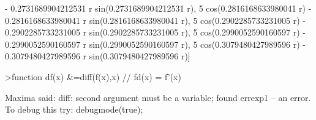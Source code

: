 \documentclass[a4paper,10pt]{article}
\begin{document}
\begin{eulernotebook}
\begin{eulercomment}
\begin{eulercomment}
\begin{eulercomment}
\begin{eulercomment}
\begin{eulercomment}
\begin{eulercomment}
\begin{eulercomment}
\begin{eulercomment}
\begin{eulercomment}
\begin{eulercomment}
\begin{eulercomment}
\begin{eulercomment}
\begin{eulercomment}
\begin{eulercomment}
\begin{eulercomment}
\begin{eulercomment}
\begin{eulercomment}
\begin{eulercomment}
\begin{eulercomment}
\begin{eulercomment}
\begin{eulercomment}
\begin{eulercomment}
\begin{eulercomment}
\begin{eulercomment}
\begin{eulercomment}
\begin{eulercomment}
\begin{eulercomment}
\begin{eulercomment}
\begin{euleroutput}
   - 0.2731689904212531 r sin(0.2731689904212531 r), 
  5 cos(0.2816168633980041 r) - 0.2816168633980041 r
   sin(0.2816168633980041 r), 5 cos(0.2902285733231005 r)
   - 0.2902285733231005 r sin(0.2902285733231005 r), 
  5 cos(0.2990052590160597 r) - 0.2990052590160597 r
   sin(0.2990052590160597 r), 5 cos(0.3079480427989596 r)
   - 0.3079480427989596 r sin(0.3079480427989596 r)]
  
\end{euleroutput}
\begin{eulerprompt}
>function df(x) &=diff(f(x),x) // fd(x) = f'(x)
\end{eulerprompt}
\begin{euleroutput}
  Maxima said:
  diff: second argument must be a variable; found errexp1
   -- an error. To debug this try: debugmode(true);
  

\end{euleroutput}
\end{eulercomment}
\end{eulercomment}
\end{eulercomment}
\end{eulercomment}
\end{eulercomment}
\end{eulercomment}
\end{eulercomment}
\end{eulercomment}
\end{eulercomment}
\end{eulercomment}
\end{eulercomment}
\end{eulercomment}
\end{eulercomment}
\end{eulercomment}
\end{eulercomment}
\end{eulercomment}
\end{eulercomment}
\end{eulercomment}
\end{eulercomment}
\end{eulercomment}
\end{eulercomment}
\end{eulercomment}
\end{eulercomment}
\end{eulercomment}
\end{eulercomment}
\end{eulercomment}
\end{eulercomment}
\end{eulercomment}
\end{eulernotebook}
\end{document}
